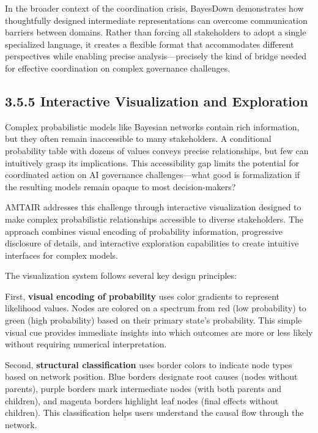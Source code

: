 \documentclass[
  11pt,
  letterpaper,
]{book}
\begin{document}
\begin{landscape}
In the broader context of the coordination crisis, BayesDown
demonstrates how thoughtfully designed intermediate representations can
overcome communication barriers between domains. Rather than forcing all
stakeholders to adopt a single specialized language, it creates a
flexible format that accommodates different perspectives while enabling
precise analysis---precisely the kind of bridge needed for effective
coordination on complex governance challenges.

\subsection*{3.5.5 Interactive Visualization and
Exploration}\label{interactive-visualization-and-exploration}

Complex probabilistic models like Bayesian networks contain rich
information, but they often remain inaccessible to many stakeholders. A
conditional probability table with dozens of values conveys precise
relationships, but few can intuitively grasp its implications. This
accessibility gap limits the potential for coordinated action on AI
governance challenges---what good is formalization if the resulting
models remain opaque to most decision-makers?

AMTAIR addresses this challenge through interactive visualization
designed to make complex probabilistic relationships accessible to
diverse stakeholders. The approach combines visual encoding of
probability information, progressive disclosure of details, and
interactive exploration capabilities to create intuitive interfaces for
complex models.

The visualization system follows several key design principles:

First, \textbf{visual encoding of probability} uses color gradients to
represent likelihood values. Nodes are colored on a spectrum from red
(low probability) to green (high probability) based on their primary
state's probability. This simple visual cue provides immediate insights
into which outcomes are more or less likely without requiring numerical
interpretation.

Second, \textbf{structural classification} uses border colors to
indicate node types based on network position. Blue borders designate
root causes (nodes without parents), purple borders mark intermediate
nodes (with both parents and children), and magenta borders highlight
leaf nodes (final effects without children). This classification helps
users understand the causal flow through the network.


\end{landscape}
\end{document}
